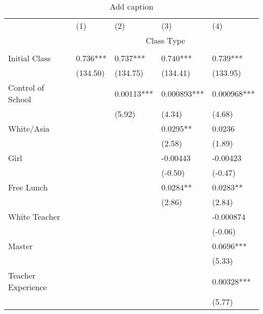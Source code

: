 \documentclass{article}
\begin{document}
\begin{table}[htbp]
  \centering
  \caption{Add caption}
    \begin{tabular}{lllrr}
    \toprule
          & (1)   & (2)   & \multicolumn{1}{l}{(3)} & \multicolumn{1}{l}{(4)} \\
          & \multicolumn{4}{c}{Class Type} \\
          &       &       &       &  \\
    Initial Class & 0.736*** & 0.737*** & \multicolumn{1}{l}{0.740***} & \multicolumn{1}{l}{0.739***} \\
          & (134.50) & (134.75) & \multicolumn{1}{l}{(134.41)} & \multicolumn{1}{l}{(133.95)} \\
    Control of School &       & 0.00113*** & \multicolumn{1}{l}{0.000893***} & \multicolumn{1}{l}{0.000968***} \\
          &       & (5.92) & \multicolumn{1}{l}{(4.34)} & \multicolumn{1}{l}{(4.68)} \\
    White/Asia &       &       & \multicolumn{1}{l}{0.0295**} & \multicolumn{1}{l}{0.0236} \\
          &       &       & \multicolumn{1}{l}{(2.58)} & \multicolumn{1}{l}{(1.89)} \\
    Girl  &       &       & \multicolumn{1}{l}{-0.00443} & \multicolumn{1}{l}{-0.00423} \\
          &       &       & \multicolumn{1}{l}{(-0.50)} & \multicolumn{1}{l}{(-0.47)} \\
    Free Lunch &       &       & \multicolumn{1}{l}{0.0284**} & \multicolumn{1}{l}{0.0283**} \\
          &       &       & \multicolumn{1}{l}{(2.86)} & \multicolumn{1}{l}{(2.84)} \\
    White Teacher &       &       & \multicolumn{1}{l}{} & \multicolumn{1}{l}{-0.000874} \\
          &       &       & \multicolumn{1}{l}{} & \multicolumn{1}{l}{(-0.06)} \\
    Master &       &       & \multicolumn{1}{l}{} & \multicolumn{1}{l}{0.0696***} \\
          &       &       & \multicolumn{1}{l}{} & \multicolumn{1}{l}{(5.33)} \\
    Teacher Experience &       &       & \multicolumn{1}{l}{} & \multicolumn{1}{l}{0.00328***} \\
          &       &       & \multicolumn{1}{l}{} & \multicolumn{1}{l}{(5.77)} \\

\end{tabular}
\end{table}
\end{document}
